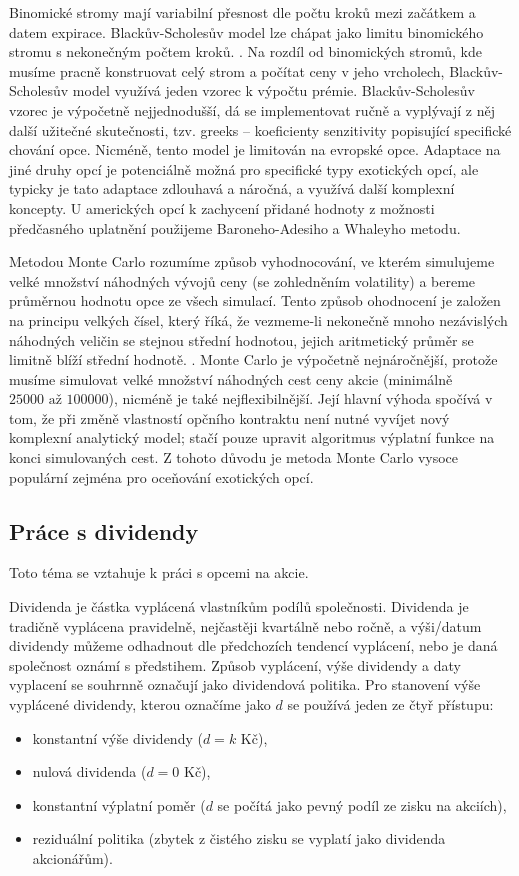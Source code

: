 \documentclass[male,czech,api_bc]{kitheses}
\begin{document}
  Binomické stromy mají variabilní přesnost dle počtu kroků mezi začátkem a datem expirace. Blackův-Scholesův model lze chápat jako limitu binomického stromu s nekonečným počtem kroků. \parencites[s.~363]{McDonald2013}. Na rozdíl od binomických stromů, kde musíme pracně konstruovat celý strom a počítat ceny v jeho vrcholech, Blackův-Scholesův model využívá jeden vzorec k výpočtu prémie. Blackův-Scholesův vzorec je výpočetně nejjednodušší, dá se implementovat ručně a vyplývají z něj další užitečné skutečnosti, tzv. greeks – koeficienty senzitivity popisující specifické chování opce. Nicméně, tento model je limitován na evropské opce. Adaptace na jiné druhy opcí je potenciálně možná pro specifické typy exotických opcí, ale typicky je tato adaptace zdlouhavá a náročná, a využívá další komplexní koncepty. U amerických opcí k zachycení přidané hodnoty z možnosti předčasného uplatnění použijeme Baroneho-Adesiho a Whaleyho metodu.

  Metodou Monte Carlo rozumíme způsob vyhodnocování, ve kterém simulujeme velké množství náhodných vývojů ceny (se zohledněním volatility) a bereme průměrnou hodnotu opce ze všech simulací. Tento způsob ohodnocení je založen na principu velkých čísel, který říká, že vezmeme-li nekonečně mnoho nezávislých náhodných veličin se stejnou střední hodnotou, jejich aritmetický průměr se limitně blíží střední hodnotě. \parencites[kapitoly~8.2,8.4]{Ross2019}.
  Monte Carlo je výpočetně nejnáročnější, protože musíme simulovat velké množství náhodných cest ceny akcie (minimálně $25 000 \text{ až } 100 000$), nicméně je také nejflexibilnější. Její hlavní výhoda spočívá v tom, že při změně vlastností opčního kontraktu není nutné vyvíjet nový komplexní analytický model; stačí pouze upravit algoritmus výplatní funkce na konci simulovaných cest. Z tohoto důvodu je metoda Monte Carlo vysoce populární zejména pro oceňování exotických opcí.

  \subsection{Práce s dividendy}

  \label{sec:dividends}
  Toto téma se vztahuje k práci s opcemi na akcie.

  Dividenda je částka vyplácená vlastníkům podílů společnosti. Dividenda je tradičně vyplácena pravidelně, nejčastěji kvartálně nebo ročně, a výši/datum dividendy můžeme odhadnout dle předchozích tendencí vyplácení, nebo je daná společnost oznámí s předstihem. Způsob vyplácení, výše dividendy a daty vyplacení se souhrnně označují jako dividendová politika. Pro stanovení výše vyplácené dividendy, kterou označíme jako $d$ se používá jeden ze čtyř přístupu:
  \begin{itemize}
    \item konstantní výše dividendy ($d = k \text{ Kč}$),
    \item nulová dividenda ($d = 0 \text{ Kč}$),
    \item konstantní výplatní poměr ($d$ se počítá jako pevný podíl ze zisku na akciích),
    \item reziduální politika (zbytek z čistého zisku se vyplatí jako dividenda akcionářům).
  \end{itemize}
\end{document}
